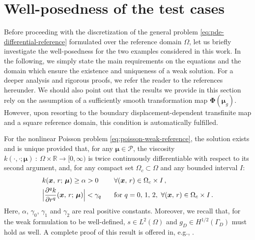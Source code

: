\documentclass[12pt, a4paper, twoside, openright]{report}
\numberwithin{equation}{chapter}
\theoremstyle{theorem}
\theoremstyle{definition}
\theoremstyle{remark}
\theoremstyle{proposition}
\numberwithin{figure}{chapter}
\newcommand{\bg}[1]{\boldsymbol{#1}}
\begin{document}
	\vspace*{0.3cm}
	
	\section{Well-posedness of the test cases}
	\label{section:Well-posedness of the test cases}
	
		Before proceeding with the discretization of the general problem \eqref{eq:pde-differential-reference} formulated over the reference domain $\Omega$, let us briefly investigate the well-posedness for the two examples considered in this work. In the following, we simply state the main requirements on the equations and the domain which ensure the existence and uniqueness of a weak solution. For a deeper analysis and rigorous proofs, we refer the reader to the references hereunder. We should also point out that the results we provide in this section rely on the assumption of a sufficiently smooth transformation map $\bg{\Phi}(\bg{\mu}_g)$. However, upon resorting to the boundary displacement-dependent transfinite map and a square reference domain, this condition is automatically fulfilled. 
		
		For the nonlinear Poisson problem \eqref{eq:poisson-weak-reference}, the solution exists and is unique provided that, for any $\bg{\mu} \in \mathcal{P}$, the viscosity $k(\cdot, \cdot; \bg{\mu}) ~ : ~ \Omega \times \mathbb{R} \rightarrow [0,\infty)$ is twice continuously differentiable with respect to its second argument, and, for any compact set $\Omega_c \subset \Omega$ and any bounded interval $I$:
		\begin{equation*}
			\begin{aligned}
				& k(\bg{x}, \, r; \, \bg{\mu}) \geq \alpha > 0 && \forall (\bg{x}, \, r) \in \Omega_c \times I \, , \\
				& \Big\lvert \dfrac{\partial^q k}{\partial r^q}(\bg{x}, \, r; \, \bg{\mu}) \Big\rvert < \gamma_q \hspace*{0.3cm} && \text{for} \,\, q = 0, \, 1, \, 2, \, \, \forall (\bg{x}, \, r) \in \Omega_c \times I \, .
			\end{aligned}
		\end{equation*}
		Here, $\alpha$, $\gamma_0$, $\gamma_1$ and $\gamma_2$ are real positive constants. Moreover, we recall that, for the weak formulation to be well-defined, $s \in L^2(\Omega)$ and $g_D \in H^{1/2}(\Gamma_D)$ must hold as well. A complete proof of this result is offered in, e.g., \cite{CR97}.
		
\end{document}
